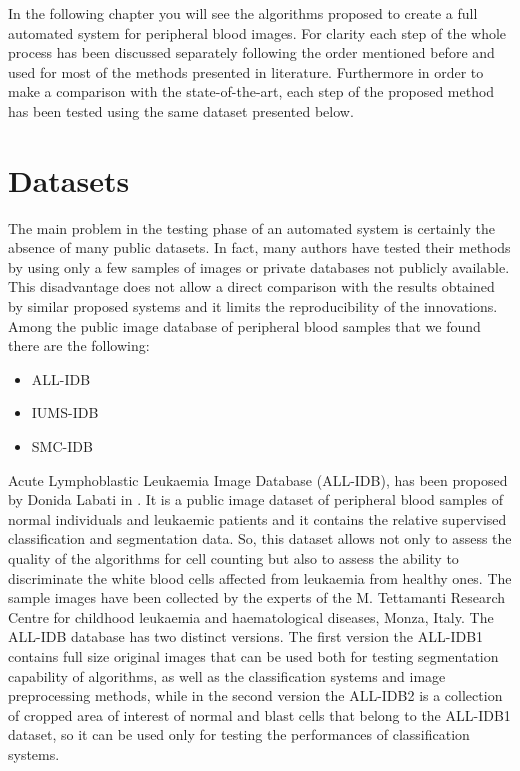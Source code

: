 \documentclass[final,a4paper,12pt,english]{UnicaPhdThesis3}
\begin{document}
In the following chapter you will see the algorithms proposed to create a full automated system for peripheral blood images. For clarity each step of the whole process has been discussed separately following the order mentioned before and used for most of the methods presented in literature. Furthermore in order to make a comparison with the state-of-the-art, each step of the proposed method has been tested using the same dataset presented below.

\section{Datasets}
The main problem in the testing phase ​of an automated system is certainly the absence of many public datasets. In fact, many authors have tested their methods by using only a few samples of images or private databases not publicly available. This disadvantage does not allow a direct comparison with the results obtained by similar proposed systems and it limits the reproducibility of the innovations. Among the public image database of peripheral blood samples that we found there are the following:
\begin{itemize}
	\item ALL-IDB \cite{Donida}
	\item IUMS-IDB \cite{Sarrafzadeh}
	\item SMC-IDB \cite{Mohamed}
\end{itemize} 
Acute Lymphoblastic Leukaemia Image Database (\acs{ALL-IDB}), has been proposed by Donida Labati in \cite{Donida}. It is a public image dataset of peripheral blood samples of normal individuals and leukaemic patients and it contains the relative supervised classification and segmentation data. So, this dataset allows not only to assess the quality of the algorithms for cell counting but also to assess the ability to discriminate the white blood cells affected from leukaemia from healthy ones. The sample images have been collected by the experts of the M. Tettamanti Research Centre for childhood leukaemia and haematological diseases, Monza, Italy. The ALL-IDB database has two distinct versions. The first version the ALL-IDB1 contains full size original images that can be used both for testing segmentation capability of algorithms, as well as the classification systems and image preprocessing methods, while in the second version the ALL-IDB2 is a collection of cropped area of interest of normal and blast cells that belong to the ALL-IDB1 dataset, so it can be used only for testing the performances of classification systems.
\end{document}
